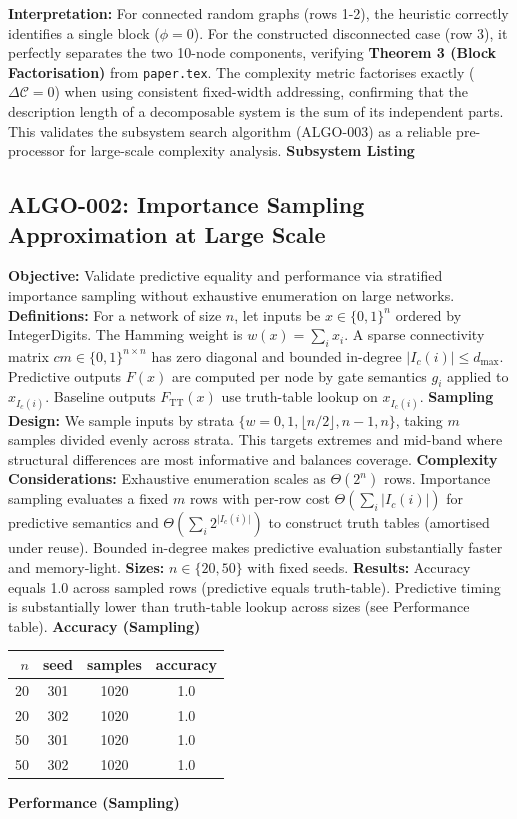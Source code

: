 \textbf{Interpretation:} For connected random graphs (rows 1-2), the heuristic correctly identifies a single block ($\phi=0$). For the constructed disconnected case (row 3), it perfectly separates the two 10-node components, verifying \textbf{Theorem 3 (Block Factorisation)} from \texttt{paper.tex}. The complexity metric factorises exactly ($\Delta \mathcal{C}=0$) when using consistent fixed-width addressing, confirming that the description length of a decomposable system is the sum of its independent parts. This validates the subsystem search algorithm (ALGO-003) as a reliable pre-processor for large-scale complexity analysis.
\textbf{Subsystem Listing}
\subsection{ALGO-002: Importance Sampling Approximation at Large Scale}
\textbf{Objective:} Validate predictive equality and performance via stratified importance sampling without exhaustive enumeration on large networks.
\textbf{Definitions:} For a network of size \(n\), let inputs be \(x\in\{0,1\}^n\) ordered by IntegerDigits. The Hamming weight is \(w(x)=\sum_i x_i\). A sparse connectivity matrix \(cm\in\{0,1\}^{n\times n}\) has zero diagonal and bounded in-degree \(\lvert I_c(i)\rvert\le d_{\max}\). Predictive outputs \(F(x)\) are computed per node by gate semantics \(g_i\) applied to \(x_{I_c(i)}\). Baseline outputs \(F_\mathrm{TT}(x)\) use truth-table lookup on \(x_{I_c(i)}\).
\textbf{Sampling Design:} We sample inputs by strata \(\{w=0,1,\lfloor n/2\rfloor,n-1,n\}\), taking \(m\) samples divided evenly across strata. This targets extremes and mid-band where structural differences are most informative and balances coverage.
\textbf{Complexity Considerations:} Exhaustive enumeration scales as \(\Theta(2^n)\) rows. Importance sampling evaluates a fixed \(m\) rows with per-row cost \(\Theta(\sum_i \lvert I_c(i)\rvert)\) for predictive semantics and \(\Theta(\sum_i 2^{\lvert I_c(i)\rvert})\) to construct truth tables (amortised under reuse). Bounded in-degree makes predictive evaluation substantially faster and memory-light.
\textbf{Sizes:} \(n\in\{20,50\}\) with fixed seeds.
\textbf{Results:} Accuracy equals 1.0 across sampled rows (predictive equals truth-table). Predictive timing is substantially lower than truth-table lookup across sizes (see Performance table).
\textbf{Accuracy (Sampling)}
\begin{center}
\begin{tabular}{rccc}
\toprule
$n$ & seed & samples & accuracy \\
\midrule
20 & 301 & 1020 & 1.0 \\
20 & 302 & 1020 & 1.0 \\
50 & 301 & 1020 & 1.0 \\
50 & 302 & 1020 & 1.0 \\
\bottomrule
\end{tabular}
\end{center}
\textbf{Performance (Sampling)}
 
